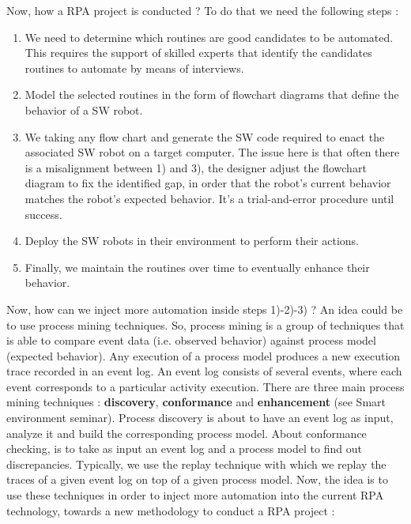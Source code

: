 \documentclass[11pt]{article}
\begin{document}
Now, how a RPA project is conducted ? To do that we need the following steps :
\begin{enumerate}
\item We need to determine which routines are good candidates to be automated. This requires the support of skilled experts that identify the candidates routines to automate by means of interviews.

\item Model the selected routines in the form of flowchart diagrams that define the behavior of a SW robot.

\item We taking any flow chart and generate the SW code required to enact the associated SW robot on a target computer. The issue here is that often there is a misalignment between 1) and 3), the designer adjust the flowchart diagram to fix the identified gap, in order that the robot's current behavior matches the robot's expected behavior. It's a trial-and-error procedure until success.

\item Deploy the SW robots in their environment to perform their actions.

\item Finally, we maintain the routines over time to eventually enhance their behavior.
\end{enumerate}

Now, how can we inject more automation inside steps 1)-2)-3) ? An idea could be to use process mining techniques. So, process mining is a group of techniques that is able to compare event data (i.e. observed behavior)  against process model (expected behavior). Any execution of a process model produces a new execution trace recorded in an event log. An event log consists of several events, where each event corresponds to a particular activity execution. There are three main process mining techniques : \textbf{discovery}, \textbf{conformance} and \textbf{enhancement} (see Smart environment seminar). Process discovery is about to have an event log as input, analyze it and build the corresponding process model. About conformance checking, is to take as input an event log and a process model to find out discrepancies. Typically, we use the replay technique with which we replay the traces of a given event log on top of a given process model. Now, the idea is to use these techniques in order to inject more automation into the current RPA technology, towards a new methodology to conduct a RPA project :
\end{document}
